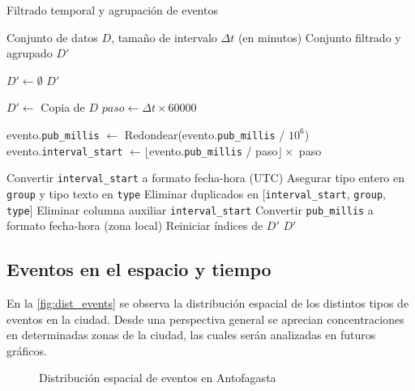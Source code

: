 \documentclass[12pt]{article}
\begin{document}
\begin{algorithm}[H]
\caption{Filtrado temporal y agrupación de eventos}
\label{alg:filter}
\begin{algorithmic}[1]
\Require Conjunto de datos $D$, tamaño de intervalo $\Delta t$ (en minutos)
\Ensure Conjunto filtrado y agrupado $D'$

\State $D' \gets \emptyset$
    \State \Return $D'$
\EndIf

\State $D' \gets$ Copia de $D$
\State $paso \gets \Delta t \times 60000$ 

        \State evento.\texttt{pub\_millis} $\gets$ Redondear(evento.\texttt{pub\_millis} / $10^6$)
    \EndIf
    \State evento.\texttt{interval\_start} $\gets \lfloor$evento.\texttt{pub\_millis} / paso$\rfloor \times$ paso
\EndFor

\State Convertir \texttt{interval\_start} a formato fecha-hora (UTC)
\State Asegurar tipo entero en \texttt{group} y tipo texto en \texttt{type}
\State Eliminar duplicados en [\texttt{interval\_start}, \texttt{group}, \texttt{type}]
\State Eliminar columna auxiliar \texttt{interval\_start}
\State Convertir \texttt{pub\_millis} a formato fecha-hora (zona local)
\State Reiniciar índices de $D'$
\State \Return $D'$
\end{algorithmic}
\end{algorithm}


\subsection{Eventos en el espacio y tiempo}

En la \autoref{fig:dist_events} se observa la distribución espacial de los distintos tipos de eventos en la ciudad. Desde una perspectiva general se aprecian concentraciones en determinadas zonas de la ciudad, las cuales serán analizadas en futuros gráficos.

\begin{figure}[H]
    \centering
    \caption{Distribución espacial de eventos en Antofagasta}
    \label{fig:dist_events}
\end{figure}
\end{document}
